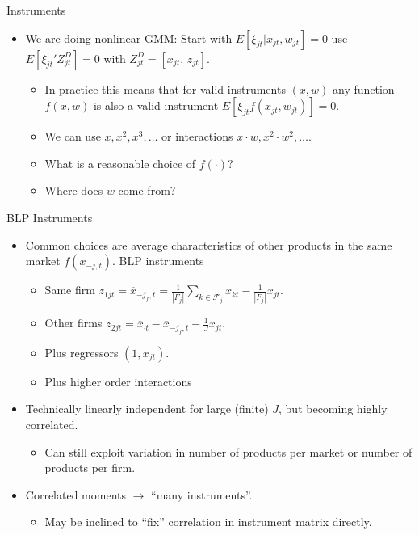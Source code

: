 \documentclass[xcolor=pdftex,dvipsnames,table,mathserif,aspectratio=169]{beamer}
\begin{document}
\begin{frame}{Instruments}
\begin{itemize}
\item We are doing nonlinear GMM: Start with $E[\xi_{jt} | x_{jt}, w_{jt}]=0$ use $E[\xi_{jt}' Z_{jt}^D]=0$ with $Z_{jt}^D=[x_{jt},\,  z_{jt}]$.
\begin{itemize}
\item In practice this means that for valid instruments $(x,w)$ any function $f(x,w)$ is also a valid instrument $E[ \xi_{jt} f(x_{jt},w_{jt})]=0$.
\item We can use $x, x^2, x^3,\ldots$ or interactions $x \cdot w, x^2 \cdot w^2, \ldots$.
\item What is a reasonable choice of $f(\cdot)$?
\item Where does $w$ come from?
\end{itemize}
\end{itemize}
\end{frame}


\begin{frame}{BLP Instruments}
\begin{itemize}
\item Common choices are average characteristics of other products in the same market $f(x_{-j,t})$. \alert{BLP instruments}
\begin{itemize}
\item Same firm $z_{1jt} = \overline{x}_{-j_f,t} = \frac{1}{\left\vert{F_j}\right\vert}  \sum_{k \in \mathcal{F}_j} x_{kt} - \frac{1}{\left\vert{F_j}\right\vert} x_{jt}$.
\item Other firms $z_{2jt}=\overline{x}_{\cdot t} - \overline{x}_{-j_f,t} - \frac{1}{J} x_{jt}$.
\item Plus regressors $(1, x_{jt})$.
\item Plus higher order interactions 
\end{itemize}
\item Technically linearly independent for large (finite) $J$, but becoming highly correlated.
\begin{itemize}
\item Can still exploit variation in number of products per market or number of products per firm.
\end{itemize}
\item Correlated moments $\rightarrow$ ``many instruments''.
\begin{itemize}
\item May be inclined to ``fix'' correlation in instrument matrix directly.
\end{itemize}
\end{itemize}
\end{frame}
\end{document}
